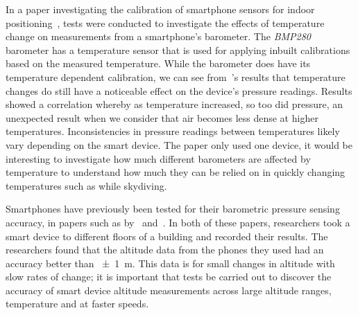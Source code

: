 \documentclass[11pt, twocolumn]{article}
\begin{document}
In a paper investigating the calibration of smartphone sensors for indoor positioning~\cite{keller_calibration_2012}, tests were conducted to investigate the effects of temperature change on measurements from a smartphone's barometer. The \textit{BMP280} barometer has a temperature sensor that is used for applying inbuilt calibrations based on the measured temperature. While the barometer does have its temperature dependent calibration, we can see from~\citeauthor{keller_calibration_2012}'s results that temperature changes do still have a noticeable effect on the device's pressure readings. Results showed a correlation whereby as temperature increased, so too did pressure, an unexpected result when we consider that air becomes less dense at higher temperatures. Inconsistencies in pressure readings between temperatures likely vary depending on the smart device. The paper only used one device, it would be interesting to investigate how much different barometers are affected by temperature to understand how much they can be relied on in quickly changing temperatures such as while skydiving.

Smartphones have previously been tested for their barometric pressure sensing accuracy, in papers such as by~\textcite{keller_calibration_2012} and~\textcite{he_atmospheric_2012}. In both of these papers, researchers took a smart device to different floors of a building and recorded their results. The researchers found that the altitude data from the phones they used had an accuracy better than \SI{\pm1}{\metre}. This data is for small changes in altitude with slow rates of change; it is important that tests be carried out to discover the accuracy of smart device altitude measurements across large altitude ranges, temperature and at faster speeds.
\end{document}
